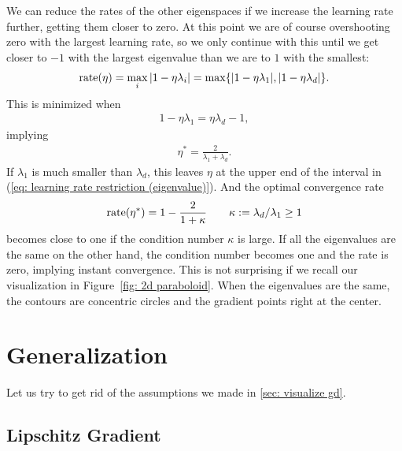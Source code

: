 We can reduce the rates of the other eigenspaces if we
increase the learning rate further, getting them closer to zero. At this point
we are of course overshooting zero with the largest learning rate, so we only
continue with this until we get closer to \(-1\) with the largest eigenvalue
than we are to \(1\) with the smallest:
%
\begin{align*}
	\text{rate}(\eta)=\max_{i} |1-\eta\lambda_i| = \max\{|1-\eta\lambda_1|, |1-\eta\lambda_d|\}.
\end{align*}
%
This is minimized when
%
\begin{align*}
	1-\eta\lambda_1 = \eta\lambda_d -1,
\end{align*}
%
implying
%
\begin{align*}
	\eta^* = \frac{2}{\lambda_1 + \lambda_d}.
\end{align*}
%
If \(\lambda_1\) is much smaller than \(\lambda_d\), this leaves \(\eta\)
at the upper end of the interval in (\ref{eq: learning rate restriction
(eigenvalue)}). And the optimal convergence rate
%
\begin{align*}
	\text{rate}(\eta^*)
	= 1 - \frac{2}{1+\kappa}
	\qquad \kappa:=\lambda_d/\lambda_1 \ge 1
\end{align*}
%
becomes close to one if the condition number \(\kappa\) is large.
If all the eigenvalues are the same on the other hand, the condition number
becomes one and the rate is zero, implying instant convergence. This is not
surprising if we recall our visualization in Figure~\ref{fig: 2d paraboloid}.
When the eigenvalues are the same, the contours are concentric circles and the
gradient points right at the center.


\section{Generalization}

Let us try to get rid of the assumptions we made in \ref{sec: visualize gd}.

\subsection{Lipschitz Gradient}

